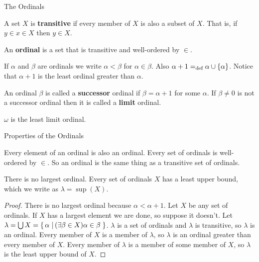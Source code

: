 \documentclass[pdf,final]{prosper}
\newcommand{\skipsmall}{\vspace{1em}}
\begin{document}
\begin{slide}{The Ordinals}

\begin{definition}
A set $X$ is \textbf{transitive} if every member of $X$ is also a subset of $X$.
That is, if $y\in x\in X$ then $y\in X$.
\end{definition}

\skipsmall

\begin{definition}
An \textbf{ordinal} is a set that is transitive and well-ordered by $\in$.
\end{definition}

\skipsmall

\begin{definition}
If $\alpha$ and $\beta$ are ordinals we write $\alpha<\beta$ for
$\alpha\in\beta$. Also $\alpha+1=_{\text{def}}\alpha\cup\left\{\alpha\right\}$. Notice
that $\alpha+1$ is the least ordinal greater than $\alpha$.
\end{definition}

\skipsmall

\begin{definition}
An ordinal $\beta$ is called a \textbf{successor} ordinal if $\beta=\alpha+1$
for some $\alpha$. If $\beta\neq 0$ is not a successor ordinal then it is
called a \textbf{limit} ordinal.
\end{definition}

\skipsmall

\begin{definition}
$\omega$ is the least limit ordinal.
\end{definition}


\end{slide}

\begin{slide}{Properties of the Ordinals}
\begin{remark}
Every element of an ordinal is also an ordinal. Every set of ordinals is
well-ordered by
$\in$. So an ordinal is the same thing as a transitive set of ordinals.
\end{remark}

\skipsmall

\begin{lemma}
There is no largest ordinal. Every set of ordinals $X$ has a least upper bound,
which we write as $\lambda=\sup(X)$.
\end{lemma}
\begin{proof}
There is no largest ordinal because $\alpha<\alpha+1$. Let $X$
be any set of ordinals. If $X$ has a largest element we are done, so suppose it doesn't.
Let $\lambda=\bigcup X = \left\{ \, \alpha \, \left| \, (\exists\beta\in X)\alpha\in\beta \, \right.\right\}$.
$\lambda$ is a set of ordinals and $\lambda$ is transitive, so $\lambda$ is an
ordinal. Every member of $X$ is a member of $\lambda$, so $\lambda$ is an
ordinal greater than every member of $X$. Every member of $\lambda$ is a member
of some member of $X$, so $\lambda$ is the least upper bound of $X$.
\end{proof}


\end{slide}
\end{document}
